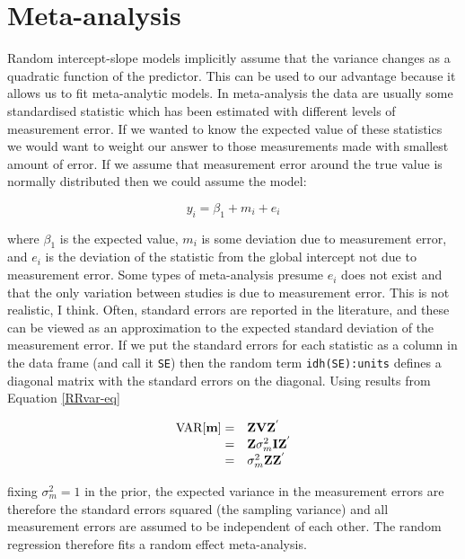 \documentclass{article}
\begin{document}
\section{Meta-analysis}

Random intercept-slope models implicitly assume that the variance changes as a quadratic function of the predictor. This can be used to our advantage because it allows us to fit meta-analytic models. In meta-analysis the data are usually some standardised statistic which has been estimated with different levels of measurement error. If we wanted to know the expected value of these statistics we would want to weight our answer to those measurements made with smallest amount of error.  If we assume that measurement error around the true value is normally distributed then we could assume the model:


\begin{equation}
y_{i} = \beta_{1} + m_{i} +e _{i}
\end{equation} 
 
where $\beta_{1}$ is the expected value, $m_{i}$ is some deviation due to measurement error, and $e_{i}$ is the deviation of the statistic from the global intercept not due to measurement error. Some types of meta-analysis presume $e_{i}$ does not exist and that the only variation between studies is due to measurement error. This is not realistic, I think.  Often, standard errors are reported in the literature, and these can be viewed as an approximation to the expected standard deviation of the measurement error. If we put the standard errors for each statistic as a column in the data frame (and call it \texttt{SE}) then the random term \texttt{idh(SE):units} defines a diagonal matrix with the standard errors on the diagonal. Using results from Equation \ref{RRvar-eq}


\begin{equation}
\begin{array}{rl}
\textrm{VAR}[{\bf m}] =& {\bf Z}{\bf V}{\bf Z}^{'}\\ 
               =& {\bf Z}\sigma^{2}_{m}{\bf I}{\bf Z}^{'}\\ 
               =& \sigma^{2}_{m}{\bf Z}{\bf Z}^{'}\\                               
\end{array}
\end{equation} 

fixing $\sigma^{2}_{m}=1$ in the prior, the expected variance in the measurement errors are therefore the standard errors squared (the sampling variance) and all measurement errors are assumed to be independent of each other. The random regression therefore fits a random effect meta-analysis.   
\end{document}

